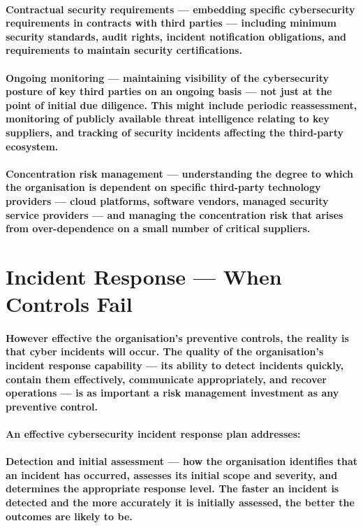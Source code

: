 \paragraph{\textbf{Contractual security requirements} — embedding specific cybersecurity requirements in contracts with third parties — including minimum security standards, audit rights, incident notification obligations, and requirements to maintain security certifications.}
\paragraph{\textbf{Ongoing monitoring} — maintaining visibility of the cybersecurity posture of key third parties on an ongoing basis — not just at the point of initial due diligence. This might include periodic reassessment, monitoring of publicly available threat intelligence relating to key suppliers, and tracking of security incidents affecting the third-party ecosystem.}
\paragraph{\textbf{Concentration risk management} — understanding the degree to which the organisation is dependent on specific third-party technology providers — cloud platforms, software vendors, managed security service providers — and managing the concentration risk that arises from over-dependence on a small number of critical suppliers.}

\section{Incident Response — When Controls Fail}
\paragraph{However effective the organisation's preventive controls, the reality is that cyber incidents will occur. The quality of the organisation's incident response capability — its ability to detect incidents quickly, contain them effectively, communicate appropriately, and recover operations — is as important a risk management investment as any preventive control.}
\paragraph{An effective cybersecurity incident response plan addresses:}
\paragraph{\textbf{Detection and initial assessment} — how the organisation identifies that an incident has occurred, assesses its initial scope and severity, and determines the appropriate response level. The faster an incident is detected and the more accurately it is initially assessed, the better the outcomes are likely to be.}

